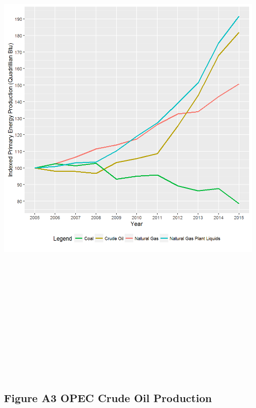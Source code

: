 \documentclass[]{article}
\begin{document}
\includegraphics[height=10.41667in]{images/EIAdata_us_primenrg_prod_indexed.png}

\newpage

\subsection{Figure A3 OPEC Crude Oil
Production}\label{figure-a3-opec-crude-oil-production}
\end{document}

